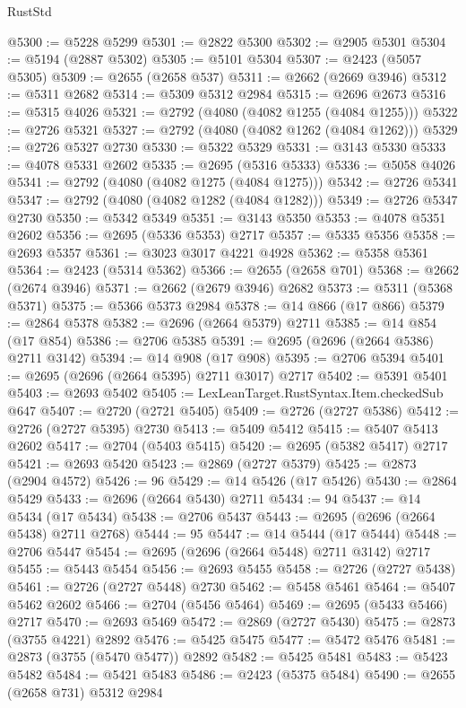 \begin{lexlean}{RustStd}
\begin{coremodule}
@5300 := @5228 @5299
@5301 := @2822 @5300
@5302 := @2905 @5301
@5304 := @5194 (@2887 @5302)
@5305 := @5101 @5304
@5307 := @2423 (@5057 @5305)
@5309 := @2655 (@2658 @537)
@5311 := @2662 (@2669 @3946)
@5312 := @5311 @2682
@5314 := @5309 @5312 @2984
@5315 := @2696 @2673
@5316 := @5315 @4026
@5321 := @2792 (@4080 (@4082 @1255 (@4084 @1255)))
@5322 := @2726 @5321
@5327 := @2792 (@4080 (@4082 @1262 (@4084 @1262)))
@5329 := @2726 @5327 @2730
@5330 := @5322 @5329
@5331 := @3143 @5330
@5333 := @4078 @5331 @2602
@5335 := @2695 (@5316 @5333)
@5336 := @5058 @4026
@5341 := @2792 (@4080 (@4082 @1275 (@4084 @1275)))
@5342 := @2726 @5341
@5347 := @2792 (@4080 (@4082 @1282 (@4084 @1282)))
@5349 := @2726 @5347 @2730
@5350 := @5342 @5349
@5351 := @3143 @5350
@5353 := @4078 @5351 @2602
@5356 := @2695 (@5336 @5353) @2717
@5357 := @5335 @5356
@5358 := @2693 @5357
@5361 := @3023 @3017 @4221 @4928
@5362 := @5358 @5361
@5364 := @2423 (@5314 @5362)
@5366 := @2655 (@2658 @701)
@5368 := @2662 (@2674 @3946)
@5371 := @2662 (@2679 @3946) @2682
@5373 := @5311 (@5368 @5371)
@5375 := @5366 @5373 @2984
@5378 := @14 @866 (@17 @866)
@5379 := @2864 @5378
@5382 := @2696 (@2664 @5379) @2711
@5385 := @14 @854 (@17 @854)
@5386 := @2706 @5385
@5391 := @2695 (@2696 (@2664 @5386) @2711 @3142)
@5394 := @14 @908 (@17 @908)
@5395 := @2706 @5394
@5401 := @2695 (@2696 (@2664 @5395) @2711 @3017) @2717
@5402 := @5391 @5401
@5403 := @2693 @5402
@5405 := LexLeanTarget.RustSyntax.Item.checkedSub @647
@5407 := @2720 (@2721 @5405)
@5409 := @2726 (@2727 @5386)
@5412 := @2726 (@2727 @5395) @2730
@5413 := @5409 @5412
@5415 := @5407 @5413 @2602
@5417 := @2704 (@5403 @5415)
@5420 := @2695 (@5382 @5417) @2717
@5421 := @2693 @5420
@5423 := @2869 (@2727 @5379)
@5425 := @2873 (@2904 @4572)
@5426 := 96
@5429 := @14 @5426 (@17 @5426)
@5430 := @2864 @5429
@5433 := @2696 (@2664 @5430) @2711
@5434 := 94
@5437 := @14 @5434 (@17 @5434)
@5438 := @2706 @5437
@5443 := @2695 (@2696 (@2664 @5438) @2711 @2768)
@5444 := 95
@5447 := @14 @5444 (@17 @5444)
@5448 := @2706 @5447
@5454 := @2695 (@2696 (@2664 @5448) @2711 @3142) @2717
@5455 := @5443 @5454
@5456 := @2693 @5455
@5458 := @2726 (@2727 @5438)
@5461 := @2726 (@2727 @5448) @2730
@5462 := @5458 @5461
@5464 := @5407 @5462 @2602
@5466 := @2704 (@5456 @5464)
@5469 := @2695 (@5433 @5466) @2717
@5470 := @2693 @5469
@5472 := @2869 (@2727 @5430)
@5475 := @2873 (@3755 @4221) @2892
@5476 := @5425 @5475
@5477 := @5472 @5476
@5481 := @2873 (@3755 (@5470 @5477)) @2892
@5482 := @5425 @5481
@5483 := @5423 @5482
@5484 := @5421 @5483
@5486 := @2423 (@5375 @5484)
@5490 := @2655 (@2658 @731) @5312 @2984

\end{coremodule}
\end{lexlean}
